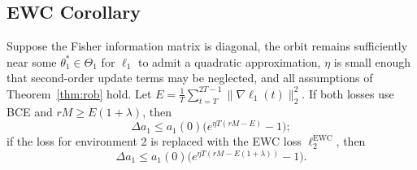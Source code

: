 \documentclass[pmlr]{jmlr} %
\begin{document}
\subsection{EWC Corollary}

\begin{corollary}
\label{cor:EWC}
Suppose the Fisher information matrix is diagonal, the orbit remains sufficiently near some $\theta_1^*\in \Theta_1$ for $\ell_1$ to admit a quadratic approximation, $\eta$ is small enough that second-order update terms may be neglected, and all assumptions of Theorem~\ref{thm:rob} hold. Let $E = \frac{1}{T}\sum_{t=T}^{2T-1} \|\nabla \ell_1(t)\|_2^2$. If both losses use BCE and $rM \ge E(1+\lambda)$, then
\[
\Delta a_1 \le a_1(0)\bigl(e^{\eta T(rM - E)}-1\bigr);
\]
if the loss for environment 2 is replaced with the EWC loss $\ell_2^{\mathrm{EWC}}$, then
\[
\Delta a_1 \le a_1(0)\bigl(e^{\eta T(rM - E(1+\lambda))}-1\bigr).
\]
\end{corollary}
\end{document}
